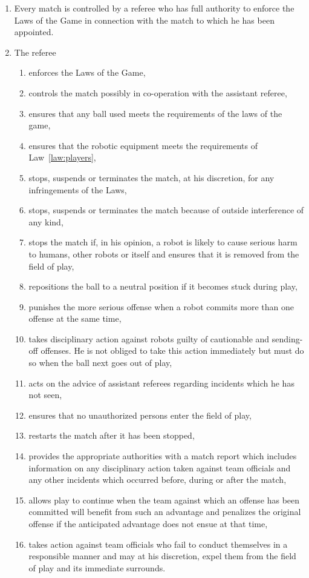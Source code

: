 \documentclass[12pt]{article}
\newcounter{law}[section]
\newenvironment{lawlist}[1][Law]{ %
  \begin{enumerate} %
    \renewcommand{\theenumi}{#1-\arabic{law}.\arabic{enumi}}} %
  {\end{enumerate}}
\begin{document}
\begin{lawlist}

\item Every match is controlled by a referee who has full authority to
  enforce the Laws of the Game in connection with the match to which
  he has been appointed.

\item The referee
  \begin{enumerate}
    \item enforces the Laws of the Game,
    \item controls the match possibly in co-operation with the
      assistant referee,
    \item ensures that any ball used meets the requirements of
      the laws of the game,
    \item ensures that the robotic equipment meets the requirements of
      Law~\ref{law:players},
    \item stops, suspends or terminates the match, at his discretion,
      for any infringements of the Laws,
    \item stops, suspends or terminates the match because of outside
      interference of any kind,
    \item stops the match if, in his opinion, a robot is likely to
      cause serious harm to humans, other robots or itself and ensures
      that it is removed from the field of play,
    \item repositions the ball to a neutral position if it becomes
      stuck during play,
    \item punishes the more serious offense when a robot commits more
      than one offense at the same time,
    \item takes disciplinary action against robots guilty of
      cautionable and sending-off offenses. He is not obliged to take
      this action immediately but must do so when the ball next goes
      out of play,
    \item acts on the advice of assistant referees regarding incidents
      which he has not seen,
    \item ensures that no unauthorized persons enter the field of play,
    \item restarts the match after it has been stopped,
    \item provides the appropriate authorities with a match report
      which includes information on any disciplinary action taken
      against team officials and any other incidents which occurred
      before, during or after the match,
    \item allows play to continue when the team against which an
      offense has been committed will benefit from such an advantage
      and penalizes the original offense if the anticipated advantage
      does not ensue at that time,
    \item takes action against team officials who fail to conduct
      themselves in a responsible manner and may at his discretion,
      expel them from the field of play and its immediate surrounds.
  \end{enumerate}


\end{lawlist}
\end{document}
